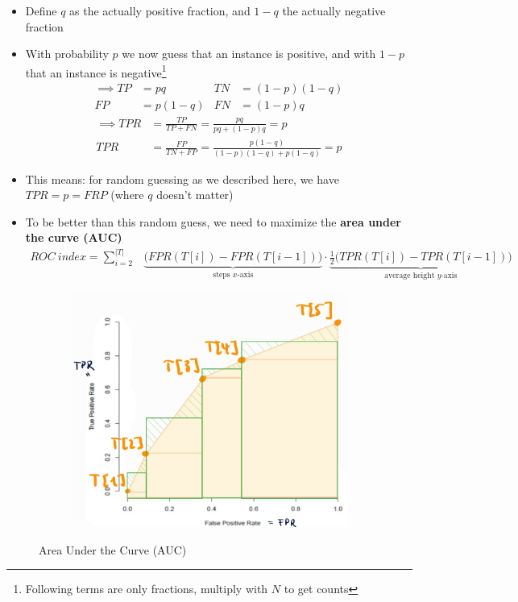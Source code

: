 \begin{itemize}
  \item Define $q$ as the actually positive fraction, and $1-q$ the actually negative fraction
  \item With probability $p$ we now guess that an instance is positive, and with $1-p$ that an instance is negative\footnote{Following terms are only fractions, multiply with $N$ to get counts}
  \begin{align*}
    \implies TP &= pq & TN &= (1-p)(1-q)\\
    FP &= p(1-q) & FN &= (1-p)q
  \end{align*}
  \begin{align*}
    \implies TPR &= \frac{TP}{TP+FN} = \frac{pq}{pq + (1-p)q} = p\\ 
    TPR &= \frac{FP}{TN+FP} = \frac{p(1-q)}{(1-p)(1-q) + p(1-q)} = p
  \end{align*}
  \item This means: for random guessing as we described here, we have $TPR = p = FRP$ (where $q$ doesn't matter)
  \item To be better than this random guess, we need to maximize the \textbf{area under the curve (AUC)}
  \begin{align*}
    ROC\ index = \sum_{i=2}^{|T|} & 
      \underbrace{\big(FPR(T[i]) - FPR(T[i-1])\big)}_{\text{steps }x\text{-axis}}\cdot 
      \underbrace{{\scriptstyle\frac{1}{2}}\big(TPR(T[i]) - TPR(T[i-1])\big)}_{\text{average height }y\text{-axis}} 
  \end{align*}
\end{itemize}

\begin{figure}[ht]
  \centering
  \begin{subfigure}{0.4\textwidth}
    \includegraphics[width=\textwidth]{assets/sl/rocc__auc.jpg}
  \end{subfigure}

  \caption{Area Under the Curve (AUC)}
  \label{fig:7_ross_auc}
\end{figure}



